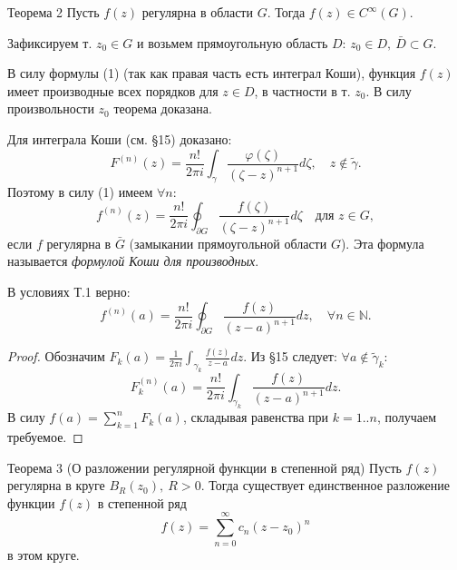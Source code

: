 \begin{theorem}{Теорема 2}
    Пусть $f(z)$ регулярна в области $G$.
    Тогда $f(z) \in C^{\infty}(G)$.
\end{theorem}
\begin{tproof}
    Зафиксируем т. $z_0 \in G$ и возьмем прямоугольную область $D$: $z_0 \in D, ~ \bar{D} \subset G$.
    
    В силу формулы (1) (так как правая часть есть интеграл Коши), функция $f(z)$ имеет производные всех порядков для $z \in D$, в частности в т. $z_0$.
    В силу произвольности $z_0$ теорема доказана.
\end{tproof}

\begin{conseq}
    Для интеграла Коши (см. §15) доказано:
    \[
        F^{(n)}(z) = \frac{n!}{2\pi i} \int_{\gamma} \frac{\varphi(\zeta)}{(\zeta - z)^{n+1}} d\zeta, \quad z \notin \tilde{\gamma}.
    \]
    Поэтому в силу (1) имеем $\forall n$:
    \begin{equation} \label{eq:20.3}
        f^{(n)}(z) = \frac{n!}{2\pi i} \oint_{\partial G} \frac{f(\zeta)}{(\zeta - z)^{n+1}} d\zeta \quad \text{для } z \in G,
    \end{equation}
    если $f$ регулярна в $\bar{G}$ (замыкании прямоугольной области $G$).
    Эта формула называется \textit{формулой Коши для производных}.
\end{conseq}

\begin{conseq}
    В условиях Т.1 верно:
    \[
        f^{(n)}(a) = \frac{n!}{2\pi i} \oint_{\partial G} \frac{f(z)}{(z - a)^{n+1}} dz, \quad \forall n \in \mathbb{N}.
    \]
\end{conseq}
\begin{proof}
    Обозначим $F_k(a) = \frac{1}{2\pi i} \int_{\gamma_k} \frac{f(z)}{z - a} dz$. Из §15 следует: $\forall a \notin \tilde{\gamma}_k$:
    \[
        F_k^{(n)}(a) = \frac{n!}{2\pi i} \int_{\gamma_k} \frac{f(z)}{(z - a)^{n+1}} dz.
    \]
    В силу $f(a) = \sum_{k=1}^{n} F_k(a)$, складывая равенства при $k=1..n$, получаем требуемое.
\end{proof}

\begin{theorem}{Теорема 3 (О разложении регулярной функции в степенной ряд)}
    Пусть $f(z)$ регулярна в круге $B_R(z_0), ~ R > 0$.
    Тогда существует единственное разложение функции $f(z)$ в степенной ряд
    \begin{equation} \label{eq:20.4}
        f(z) = \sum_{n=0}^{\infty} c_n (z - z_0)^n
    \end{equation}
    в этом круге.
\end{theorem}

